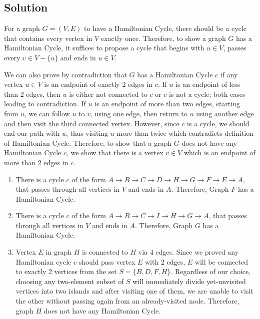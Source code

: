 \subsection*{Solution}

For a graph $G = (V,E)$ to have a Hamiltonian Cycle, there should be a cycle that contains every vertex in $V$ exactly once.
Therefore, to show a graph $G$ has a Hamiltonian Cycle, it suffices to propose a cycle that begins with $u \in V$, passes every $v \in V-\{u\}$ and ends in $u \in V$.

We can also prove by contradiction that $G$ has a Hamiltonian Cycle $c$ if any vertex $u \in V$ is an endpoint of exactly $2$ edges in $c$.
If $u$ is an endpoint of less than 2 edges, then $u$ is either not connected to $c$ or $c$ is not a cycle; both cases leading to contradiction.
If $u$ is an endpoint of more than two edges, starting from $u$, we can follow $u$ to $v$, using one edge, then return to $u$ using another edge and then visit the third connected vertex.
However, since $c$ is a cycle, we should end our path with $u$, thus visiting $u$ more than twice which contradicts definition of Hamiltonian Cycle.
Therefore, to show that a graph $G$ does not have any Hamiltonian Cycle $c$, we show that there is a vertex $v \in V$ which is an endpoint of more than 2 edges in $c$.
\begin{enumerate}[label=(\alph*)]
\item There is a cycle $c$ of the form $A \rightarrow B \rightarrow C \rightarrow D \rightarrow H \rightarrow G \rightarrow F \rightarrow E \rightarrow A$, that passes through all vertices in $V$ and ends in $A$.
Therefore, Graph $F$ has a Hamiltonian Cycle.
\item There is a cycle $c$ of the form $A \rightarrow B \rightarrow C \rightarrow I \rightarrow H \rightarrow G \rightarrow A$, that passes through all vertices in $V$ and ends in $A$.
Therefore, Graph $G$ has a Hamiltonian Cycle.
\item Vertex $E$ in graph $H$ is connected to $H$ via 4 edges.
Since we proved any Hamiltonian cycle $c$ should pass vertex $E$ with 2 edges, $E$ will be connected to exactly 2 vertices from the set $S = \{B, D, F, H\}$.
Regardless of our choice, choosing any two-element subset of $S$ will immediately divide yet-unvisited vertices into two islands and after visiting one of them, we are unable to visit the other without passing again from an already-visited node.
Therefore, graph $H$ does not have any Hamiltonian Cycle.
\end{enumerate}

